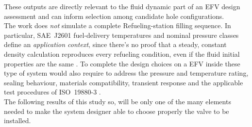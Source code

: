 These outputs are directly relevant to the fluid dynamic part of an EFV design assessment and can inform selection among candidate hole configurations.\\

The work does \emph{not} simulate a complete Refueling-station filling sequence. In particular, SAE~J2601 fuel-delivery temperatures and nominal pressure classes define an \emph{application context}, since there's no proof that a steady, constant density calculation reproduces every refueling condition, even if the fluid initial properties are the same \cite{sae_j2601}. To complete the design choices on a EFV inside these type of system  would also require to address the pressure and temperature rating, sealing behaviour, materials compatibility, transient response and the applicable test procedures of ISO~19880-3 \cite{iso19880_3}. \\

The following results of this study so, will be only one of the many elements needed to make the system designer able to choose properly the valve to be installed.
